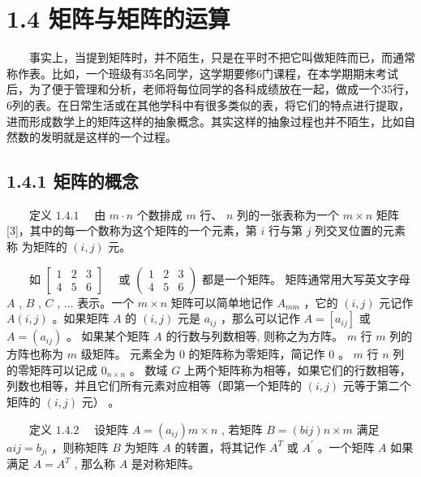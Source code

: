 \documentclass[a4paper,11pt,english]{sphinxmanual}
\begin{document}
\sphinxstepscope


\section{1.4 矩阵与矩阵的运算}
\label{\detokenize{rst/_u9644_u5f551_u91cf_u5b50_u8ba1_u7b97_u6570_u5b66_u57fa_u78403:id1}}\label{\detokenize{rst/_u9644_u5f551_u91cf_u5b50_u8ba1_u7b97_u6570_u5b66_u57fa_u78403::doc}}
\sphinxAtStartPar
​  事实上，当提到矩阵时，并不陌生，只是在平时不把它叫做矩阵而已，而通常称作表。比如，一个班级有35名同学，这学期要修6门课程，在本学期期末考试后，为了便于管理和分析，老师将每位同学的各科成绩放在一起，做成一个35行，6列的表。在日常生活或在其他学科中有很多类似的表，将它们的特点进行提取，进而形成数学上的矩阵这样的抽象概念。其实这样的抽象过程也并不陌生，比如自然数的发明就是这样的一个过程。


\subsection{1.4.1 矩阵的概念}
\label{\detokenize{rst/_u9644_u5f551_u91cf_u5b50_u8ba1_u7b97_u6570_u5b66_u57fa_u78403:id2}}
\sphinxAtStartPar
​  定义 \(1.4.1\)  由  \(m \cdot n\) 个数排成  \(m\) 行、  \(n\) 列的一张表称为一个  \(m \times n\) 矩阵{[}3{]}，其中的每一个数称为这个矩阵的一个元素，第  \(i\) 行与第  \(j\) 列交叉位置的元素称 为矩阵的  \((i, j)\) 元。

\sphinxAtStartPar
​  如  \(\begin{bmatrix} 1 & 2 & 3 \\ 4 & 5 & 6 \end{bmatrix}\quad\) 或   \(\left(\begin{array}{lll}1 & 2 & 3 \\ 4 & 5 & 6\end{array}\right)\) 都是一个矩阵。 矩阵通常用大写英文字母  \(A\) , \(B\) , \(C\) , \(\ldots\) 表示。一个  \(m \times n\) 矩阵可以简单地记作  \(A_{m m}\) ，它的  \((i, j)\) 元记作  \(A(i, j)\) 。如果矩阵  \(A\) 的  \((i, j)\) 元是  \(a_{i j}\) ，那么可以记作 \(A=\left[a_{i j}\right]\) 或  \(A=\left(a_{i j}\right)\) 。 如果某个矩阵  \(A\) 的行数与列数相等, 则称之为方阵。  \(m\) 行  \(m\) 列的方阵也称为  \(m\) 级矩阵。 元素全为 0 的矩阵称为零矩阵，简记作  \(0\) 。 \(m\) 行  \(n\) 列的零矩阵可以记成  \(0_{n \times n}\) 。 数域  \(G\) 上两个矩阵称为相等，如果它们的行数相等，列数也相等，并且它们所有元素对应相等（即第一个矩阵的  \((i, j)\) 元等于第二个矩阵的  \((i, j)\) 元） 。

\sphinxAtStartPar
​  定义 \(1.4.2\)  设矩阵  \(A=\left(a_{i j}\right){m \times n}\) , 若矩阵  \(B=\left(b{i j}\right){n \times m}\) 满足  \(a{i j}=b_{j i}\) ，则称矩阵  \(B\) 为矩阵  \(A\) 的转置，将其记作  \(A^{T}\) 或  \(A^{\prime}\) 。一个矩阵  \(A\) 如果满足  \(A=A^{T}\) , 那么称  \(A\) 是对称矩阵。
\end{document}
